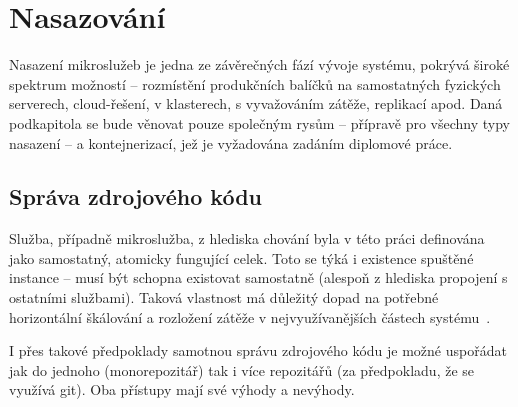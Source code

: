\section{Nasazování}\label{sec:msa-deployment}

Nasazení mikroslužeb je jedna ze závěrečných fází vývoje systému, pokrývá široké spektrum možností – rozmístění produkčních balíčků na samostatných fyzických serverech, cloud-řešení, v klasterech, s vyvažováním zátěže, replikací apod.
Daná podkapitola se bude věnovat pouze společným rysům – přípravě pro všechny typy nasazení – a kontejnerizací, jež je vyžadována zadáním diplomové práce.


\subsection{Správa zdrojového kódu}\label{subsec:msa-deployment-code}

Služba, případně mikroslužba, z hlediska chování byla v této práci definována jako samostatný, atomicky fungující celek.
Toto se týká i existence spuštěné instance – musí být schopna existovat samostatně (alespoň z hlediska propojení s ostatními službami).
Taková vlastnost má důležitý dopad na potřebné horizontální škálování a rozložení zátěže v nejvyužívanějších částech systému~\cite{monomulti}.

I přes takové předpoklady samotnou správu zdrojového kódu je možné uspořádat jak do jednoho (monorepozitář) tak i více repozitářů (za předpokladu, že se využívá  git).
Oba přístupy mají své výhody a nevýhody.


